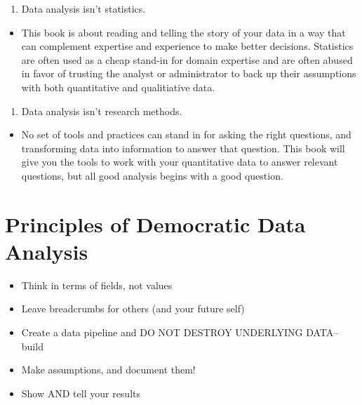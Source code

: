 \documentclass[]{book}
\providecommand{\tightlist}{%
  \setlength{\itemsep}{0pt}\setlength{\parskip}{0pt}}
\begin{document}
\begin{enumerate}
\def\labelenumi{\arabic{enumi}.}
\setcounter{enumi}{1}
\tightlist
\item
  Data analysis isn't statistics.
\end{enumerate}

\begin{itemize}
\tightlist
\item
  This book is about reading and telling the story of your data in a way that can complement expertise and experience to make better decisions. Statistics are often used as a cheap stand-in for domain expertise and are often abused in favor of trusting the analyst or administrator to back up their assumptions with both quantitative and qualitiative data.
\end{itemize}

\begin{enumerate}
\def\labelenumi{\arabic{enumi}.}
\setcounter{enumi}{2}
\tightlist
\item
  Data analysis isn't research methods.
\end{enumerate}

\begin{itemize}
\tightlist
\item
  No set of tools and practices can stand in for asking the right questions, and transforming data into information to answer that question. This book will give you the tools to work with your quantitative data to answer relevant questions, but all good analysis begins with a good question.
\end{itemize}

\hypertarget{principles-of-democratic-data-analysis}{%
\section{Principles of Democratic Data Analysis}\label{principles-of-democratic-data-analysis}}

\begin{itemize}
\tightlist
\item
  Think in terms of fields, not values
\item
  Leave breadcrumbs for others (and your future self)
\item
  Create a data pipeline and DO NOT DESTROY UNDERLYING DATA-- build
\item
  Make assumptions, and document them!
\item
  Show AND tell your results
\end{itemize}
\end{document}
